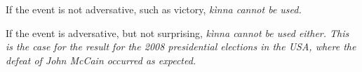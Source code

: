 If the event is not adversative, such as victory, \em kìnna \em cannot be used.


If the event is adversative, but not surprising, \em kìnna \em cannot be used either. This is the case for the result for the 2008 presidential elections in the USA, where the defeat of John McCain occurred as expected.





% 
% 
% 

% 
% 
% 
% 
% 

% 

